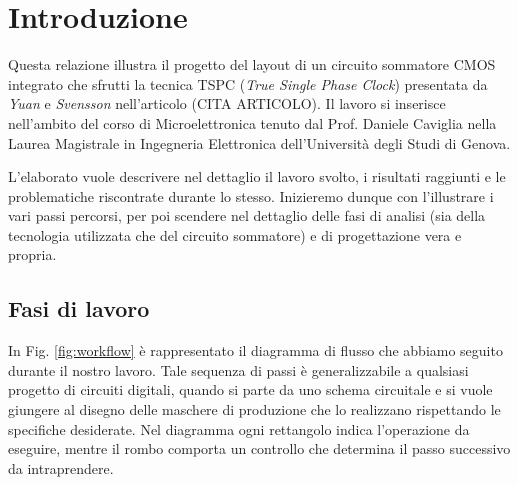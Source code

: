 
\chapter{Introduzione} %
\label{Chapter1} 


Questa relazione illustra il progetto del layout di un circuito sommatore CMOS integrato che sfrutti la tecnica TSPC (\textit{True Single Phase Clock}) presentata da \textit{Yuan} e \textit{Svensson} nell'articolo (CITA ARTICOLO). Il lavoro si inserisce nell'ambito del corso di Microelettronica tenuto dal Prof. Daniele Caviglia nella Laurea Magistrale in Ingegneria Elettronica dell'Università degli Studi di Genova.

L'elaborato vuole descrivere nel dettaglio il lavoro svolto, i risultati raggiunti e le problematiche riscontrate durante lo stesso. Inizieremo dunque con l'illustrare i vari passi percorsi, per poi scendere nel dettaglio delle fasi di analisi (sia della tecnologia utilizzata che del circuito sommatore) e di progettazione vera e propria.

\section{Fasi di lavoro}
\label{sec:sec_fasiLavoro}

In Fig. \ref{fig:workflow} è rappresentato il diagramma di flusso che abbiamo seguito durante il nostro lavoro. Tale sequenza di passi è generalizzabile a qualsiasi progetto di circuiti digitali, quando si parte da uno schema circuitale e si vuole giungere al disegno delle maschere di produzione che lo realizzano rispettando le specifiche desiderate. Nel diagramma ogni rettangolo indica l'operazione da eseguire, mentre il rombo comporta un controllo che determina il passo successivo da intraprendere. 

